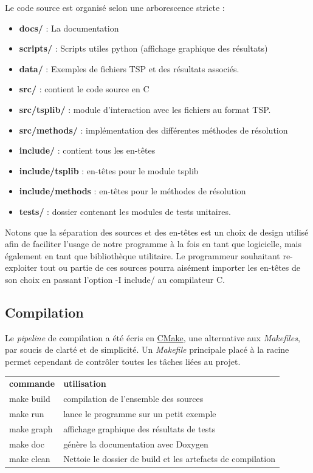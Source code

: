 \documentclass[11pt]{article}
\begin{document}
Le code source est organisé selon une arborescence stricte :

\begin{itemize}
	\item 	\textbf{docs/} : La documentation
	\item 	\textbf{scripts/} : Scripts utiles python (affichage graphique des résultats)
	\item 	\textbf{data/} : Exemples de fichiers TSP et des résultats associés.
    	\item 	\textbf{src/} : contient le code source en C
    \item 	\textbf{src/tsplib/} : module d'interaction avec les fichiers au format TSP.
	\item	\textbf{src/methods/} : implémentation des différentes méthodes de résolution
   	\item 	\textbf{include/} : contient tous les en-têtes
   	\item	\textbf{include/tsplib} : en-têtes pour le module tsplib
	\item 	\textbf{include/methods} : en-têtes pour le méthodes de résolution
    \item 	\textbf{tests/} : dossier contenant les modules de tests unitaires.
\end{itemize}

Notons que la séparation des sources et des en-têtes est un choix de design utilisé afin de faciliter l'usage de notre programme à la fois en tant que logicielle, mais également en tant que bibliothèque utilitaire. Le programmeur souhaitant re-exploiter tout ou partie de ces sources pourra aisément importer les en-têtes de son choix en passant l'option -I include/ au compilateur C.

\subsection*{Compilation}

Le \textit{pipeline} de compilation a été écris en \href{https://cmake.org}{CMake}, une alternative aux \textit{Makefiles}, par soucis de clarté et de simplicité. Un \textit{Makefile} principale placé à la racine permet cependant de contrôler toutes les tâches liées au projet. \\

\begin{tabular}{ | l | l | }
	\textbf{commande}	& \textbf{utilisation} \\
	make build 	& compilation de l'ensemble des sources \\
	make run 		& lance le programme sur un petit exemple  \\
	make graph & affichage graphique des résultats de tests \\
	make doc		& génère la documentation avec Doxygen \\
	make clean 	& Nettoie le dossier de build et les artefacts de compilation \\
\end{tabular}
\end{document}
